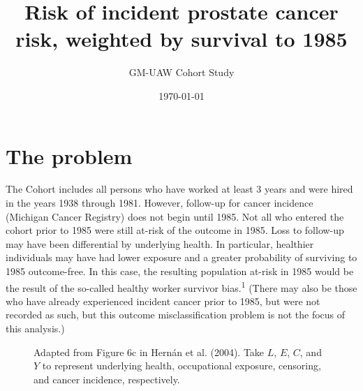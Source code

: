 \documentclass[
  11pt,
  letterpaper,
  DIV=11,
  numbers=noendperiod]{scrartcl}
\title{Risk of incident prostate cancer risk, weighted by survival to
1985}
\subtitle{GM-UAW Cohort Study}
\author{}
\date{\today}
\theoremstyle{remark}\newtheorem*{claim}{Claim}
\begin{document}
\maketitle
\ifdefined\Shaded\renewenvironment{Shaded}{\begin{tcolorbox}[boxrule=0pt, borderline west={3pt}{0pt}{shadecolor}, sharp corners, enhanced, breakable, interior hidden, frame hidden]}{\end{tcolorbox}}\fi

\renewcommand\arraystretch{1.1}
\onehalfspacing

\hypertarget{the-problem}{%
\section{The problem}\label{the-problem}}

The Cohort includes all persons who have worked at least 3 years and
were hired in the years 1938 through 1981. However, follow-up for cancer
incidence (Michigan Cancer Registry) does not begin until 1985. Not all
who entered the cohort prior to 1985 were still at-risk of the outcome
in 1985. Loss to follow-up may have been differential by underlying
health. In particular, healthier individuals may have had lower exposure
and a greater probability of surviving to 1985 outcome-free. In this
case, the resulting population at-risk in 1985 would be the result of
the so-called healthy worker survivor bias.\textsuperscript{1} (There
may also be those who have already experienced incident cancer prior to
1985, but were not recorded as such, but this outcome misclassification
problem is not the focus of this analysis.)

\begin{figure}
\caption{Adapted from Figure 6c in Hernán et al. (2004). Take $L$, $E$, $C$, and $Y$ to represent underlying health, occupational exposure, censoring, and cancer incidence, respectively.}
\centering
{}
\end{figure}
\end{document}
